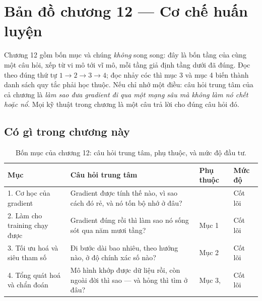 \documentclass[../../deep_learning.tex]{subfiles}
\begin{document}
\section*{Bản đồ chương 12 --- Cơ chế huấn luyện}

\begin{tomtat}
Chương 12 gồm bốn mục và chúng \emph{không} song song: đây là bốn tầng của cùng một câu hỏi, xếp từ vi mô tới vĩ mô, mỗi tầng giả định tầng dưới đã đúng. Đọc theo đúng thứ tự \(1 \rightarrow 2 \rightarrow 3 \rightarrow 4\); đọc nhảy cóc thì mục 3 và mục 4 biến thành danh sách quy tắc phải học thuộc. Nếu chỉ nhớ một điều: câu hỏi trung tâm của cả chương là \emph{làm sao đưa gradient đi qua một mạng sâu mà không làm nó chết hoặc nổ}. Mọi kỹ thuật trong chương là một câu trả lời cho đúng câu hỏi đó.
\end{tomtat}

\begin{nentang}
\end{nentang}

\subsection*{Có gì trong chương này}

\begin{table}[H]\centering\small
\caption{Bốn mục của chương 12: câu hỏi trung tâm, phụ thuộc, và mức độ đầu tư.}
\label{tab:map-ch12}
\begin{tabularx}{\linewidth}{@{}L{3.5cm}YL{2.3cm}L{2.1cm}@{}}
\toprule
\textbf{Mục} & \textbf{Câu hỏi trung tâm} & \textbf{Phụ thuộc} & \textbf{Mức độ}\\
. Cơ học của gradient & Gradient được tính thế nào, vì sao cách đó rẻ, và nó tốn bộ nhớ ở đâu? &  & Cốt lõi \\
2. Làm cho training chạy được & Gradient đúng rồi thì làm sao nó sống sót qua năm mươi tầng? & Mục 1 & Cốt lõi \\
3. Tối ưu hoá và siêu tham số & Đi bước dài bao nhiêu, theo hướng nào, ở độ chính xác số nào? & Mục 2 & Cốt lõi \\
4. Tổng quát hoá và chẩn đoán & Mô hình khớp được dữ liệu rồi, còn ngoài đời thì sao --- và hỏng thì tìm ở đâu? & Mục 3,  & Cốt lõi \\
\bottomrule
\end{tabularx}
\end{table}
\end{document}

